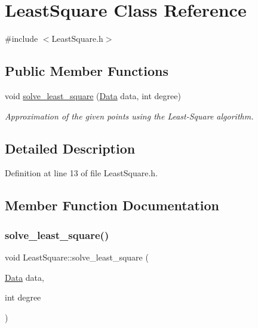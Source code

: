 \hypertarget{class_least_square}{}\section{Least\+Square Class Reference}
\label{class_least_square}


{\ttfamily \#include $<$Least\+Square.\+h$>$}

\subsection*{Public Member Functions}
\begin{DoxyCompactItemize}
\item 
void \mbox{\hyperlink{class_least_square_a666be9697ecbac69b60a886a30049073}{solve\+\_\+least\+\_\+square}} (\mbox{\hyperlink{struct_data}{Data}} data, int degree)
\begin{DoxyCompactList}\small\item\em Approximation of the given points using the Least-\/\+Square algorithm. \end{DoxyCompactList}\end{DoxyCompactItemize}


\subsection{Detailed Description}


Definition at line 13 of file Least\+Square.\+h.



\subsection{Member Function Documentation}
\mbox{\label{class_least_square_a666be9697ecbac69b60a886a30049073}} 
\subsubsection{\texorpdfstring{solve\+\_\+least\+\_\+square()}{solve\_least\_square()}}
{\footnotesize\ttfamily void Least\+Square\+::solve\+\_\+least\+\_\+square (\begin{DoxyParamCaption}\item[{\mbox{\hyperlink{struct_data}{Data}}}]{data,  }\item[{int}]{degree }\end{DoxyParamCaption})}



